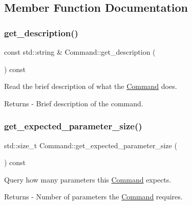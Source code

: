 \subsection{Member Function Documentation}
\mbox{\label{class_command_a6352942f26bc7f233584ee707ac46eb1}} 
\subsubsection{\texorpdfstring{get\+\_\+description()}{get\_description()}}
{\footnotesize\ttfamily const std\+::string \& Command\+::get\+\_\+description (\begin{DoxyParamCaption}{ }\end{DoxyParamCaption}) const}

Read the brief description of what the \mbox{\hyperlink{class_command}{Command}} does. \begin{DoxyReturn}{Returns}
-\/ Brief description of the command. 
\end{DoxyReturn}
\mbox{\label{class_command_ae1e1b915dfc4bbb2633c1b5e331f83e1}} 
\subsubsection{\texorpdfstring{get\+\_\+expected\+\_\+parameter\+\_\+size()}{get\_expected\_parameter\_size()}}
{\footnotesize\ttfamily std\+::size\+\_\+t Command\+::get\+\_\+expected\+\_\+parameter\+\_\+size (\begin{DoxyParamCaption}{ }\end{DoxyParamCaption}) const}

Query how many parameters this \mbox{\hyperlink{class_command}{Command}} expects. \begin{DoxyReturn}{Returns}
-\/ Number of parameters the \mbox{\hyperlink{class_command}{Command}} requires. 
\end{DoxyReturn}
\mbox{\label{class_command_afc03c74d1f90127326015faa8f5f4866}} 
